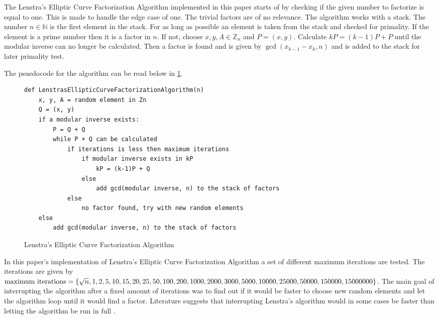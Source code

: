 The Lenstra's Elliptic Curve Factorization Algorithm implemented in this paper starts of by checking if the given number to factorize is equal to one. This is made to handle the edge case of one. The trivial factors are of no relevance. The algorithm works with a stack. The number $n\in\mathbb{N}$ is the first element in the stack. For as long as possible an element is taken from the stack and checked for primality. If the element is a prime number then it is a factor in $n$. If not, choose $x, y, A \in \mathbb{Z}_n$ and $P= (x, y)$. Calculate $kP = (k-1)P + P$ until the modular inverse can no longer be calculated. Then a factor is found and is given by $\gcd(x_{k-1}-x_k, n)$ and is added to the stack for later primality test. 

The psuedocode for the algorithm can be read below in \ref{fig:LenstrasEllipticCurveFactorizationAlgorithm}.
\begin{figure}[H]
    \centering
    \begin{minipage}{0.5\textwidth}
        \begin{verbatim}
def LenstrasEllipticCurveFactorizationAlgorithm(n)
    x, y, A = random element in Zn
    Q = (x, y)
    if a modular inverse exists:
        P = Q + Q
        while P + Q can be calculated 
            if iterations is less then maximum iterations
                if modular inverse exists in kP
                    kP = (k-1)P + Q
                else
                    add gcd(modular inverse, n) to the stack of factors
            else
                no factor found, try with new random elements
    else
        add gcd(modular inverse, n) to the stack of factors
        \end{verbatim}
    \end{minipage}
     \caption{Lenstra's Elliptic Curve Factorization Algorithm}
    \label{fig:LenstrasEllipticCurveFactorizationAlgorithm}      
 \end{figure}
 
 In this paper's implementation of Lenstra's Elliptic Curve Factorization Algorithm a set of different maximum iterations are tested. The iterations are given by $\text{maximum iterations} = \{\sqrt{n}, 1, 2, 5, 10, 15, 20, 25, 50, 100, 200, 1000, 2000, \\3000, 5000, 10000, 25000, 50000, 150000, 15000000\}$. The main goal of interrupting the algorithm after a fixed amount of iterations was to find out if it would be faster to choose new random elements and let the algorithm loop until it would find a factor. Literature suggests that interrupting Lenstra's algorithm would in some cases be faster than letting the algorithm be run in full \cite{LenstrasFactorizationAlgorithm}.
